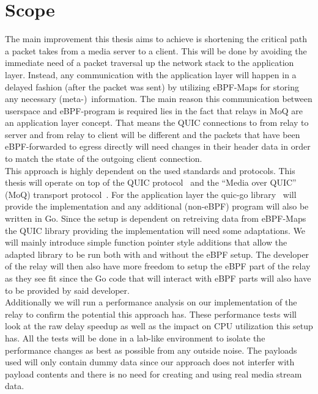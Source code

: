 \section{Scope}\label{sec:scope}

The main improvement this thesis aims to achieve is shortening the critical path a packet takes from a media server to a client.
This will be done by avoiding the immediate need of a packet traversal up the network stack to the application layer.
Instead, any communication with the application layer will happen in a delayed fashion (after the packet was sent) by utilizing 
eBPF-Maps for storing any necessary (meta-)~information.
The main reason this communication between userspace and eBPF-program is required lies in the fact that relays in MoQ are an application layer concept.
That means the QUIC connections to from relay to server and from relay to client will be different and the packets that have been eBPF-forwarded to 
egress directly will need changes in their header data in order to match the state of the outgoing client connection.  
\\
This approach is highly dependent on the used standards and protocols.
This thesis will operate on top of the QUIC protocol~\parencite{rfc-9000} and the ``Media over QUIC'' (MoQ) 
transport protocol~\parencite{draft-moqtransport}.
For the application layer the quic-go library~\parencite{quic-go-repo} will provide the implementation and 
any additional (non-eBPF) program will also be written in Go.
Since the setup is dependent on retreiving data from eBPF-Maps the QUIC library providing the implementation 
will need some adaptations.
We will mainly introduce simple function pointer style additions that allow the adapted library to be run 
both with and without the eBPF setup.
The developer of the relay will then also have more freedom to setup the eBPF part of the relay as they see fit
since the Go code that will interact with eBPF parts will also have to be provided by said developer.
\\
Additionally we will run a performance analysis on our implementation of the relay to confirm the potential this 
approach has.
These performance tests will look at the raw delay speedup as well as the impact on CPU utilization this 
setup has.
All the tests will be done in a lab-like environment to isolate the performance changes as best as possible
from any outside noise.
The payloads used will only contain dummy data since our approach does not interfer with payload contents 
and there is no need for creating and using real media stream data.
